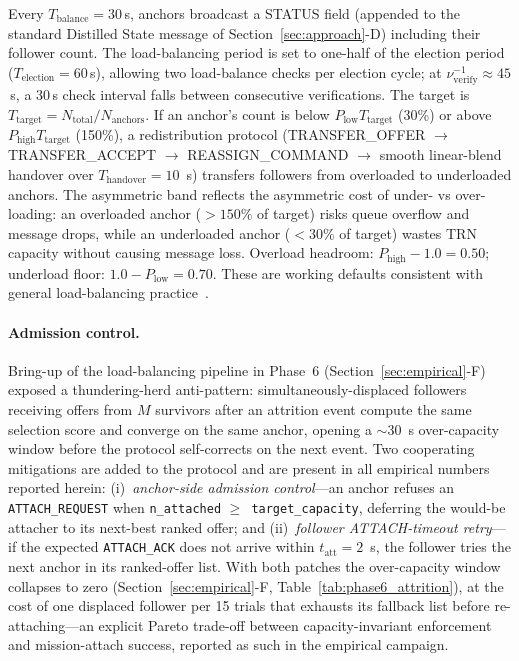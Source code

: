 \documentclass[journal,10pt,twocolumn]{IEEEtran}
\begin{document}
Every $T_\text{balance} = 30$\,s, anchors broadcast a STATUS field (appended to the standard Distilled State message of Section~\ref{sec:approach}-D) including their follower count. The load-balancing period is set to one-half of the election period ($T_\text{election}=60$\,s), allowing two load-balance checks per election cycle; at $\nu_\text{verify}^{-1}\approx 45$\,s, a 30\,s check interval falls between consecutive verifications. The target is $T_\text{target} = N_\text{total}/N_\text{anchors}$. If an anchor's count is below $P_\text{low} T_\text{target}$ (30\%) or above $P_\text{high} T_\text{target}$ (150\%), a redistribution protocol (TRANSFER\_OFFER $\rightarrow$ TRANSFER\_ACCEPT $\rightarrow$ REASSIGN\_COMMAND $\rightarrow$ smooth linear-blend handover over $T_\text{handover} = 10$~s) transfers followers from overloaded to underloaded anchors. The asymmetric band reflects the asymmetric cost of under- vs over-loading: an overloaded anchor ($>150\%$ of target) risks queue overflow and message drops, while an underloaded anchor ($<30\%$ of target) wastes TRN capacity without causing message loss. Overload headroom: $P_\text{high}-1.0=0.50$; underload floor: $1.0-P_\text{low}=0.70$. These are working defaults consistent with general load-balancing practice~\cite{eager1986adaptive}.

\paragraph*{Admission control.}
Bring-up of the load-balancing pipeline in Phase~6 (Section~\ref{sec:empirical}-F) exposed a thundering-herd anti-pattern: simultaneously-displaced followers receiving offers from $M$ survivors after an attrition event compute the same selection score and converge on the same anchor, opening a $\sim 30$~s over-capacity window before the protocol self-corrects on the next event. Two cooperating mitigations are added to the protocol and are present in all empirical numbers reported herein: (i)~\emph{anchor-side admission control}---an anchor refuses an \texttt{ATTACH\_REQUEST} when \texttt{n\_attached} $\geq$~\texttt{target\_capacity}, deferring the would-be attacher to its next-best ranked offer; and (ii)~\emph{follower ATTACH-timeout retry}---if the expected \texttt{ATTACH\_ACK} does not arrive within $t_\text{att}=2$~s, the follower tries the next anchor in its ranked-offer list. With both patches the over-capacity window collapses to zero (Section~\ref{sec:empirical}-F, Table~\ref{tab:phase6_attrition}), at the cost of one displaced follower per 15 trials that exhausts its fallback list before re-attaching---an explicit Pareto trade-off between capacity-invariant enforcement and mission-attach success, reported as such in the empirical campaign.
\end{document}
